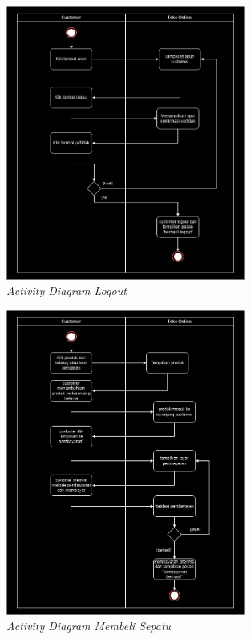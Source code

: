 \documentclass[journal,article,submit,pdftex,moreauthors]{Definitions/mdpi}
\begin{document}
\begin{figure}[H]
    \centering
    \includegraphics[width=0.7\textwidth]{images/activitylogoutdiagram.png}
    \captionsetup{justification=centering}
    \caption{\textit{Activity Diagram Logout}}
    \label{fig:activity-search}
\end{figure}

\begin{figure}[H]
    \centering
    \includegraphics[width=0.7\textwidth]{images/activitymembelisepatudiagram.png}
    \captionsetup{justification=centering}
    \caption{\textit{Activity Diagram Membeli Sepatu}}
    \label{fig:activity-cart}
\end{figure}
\end{document}
